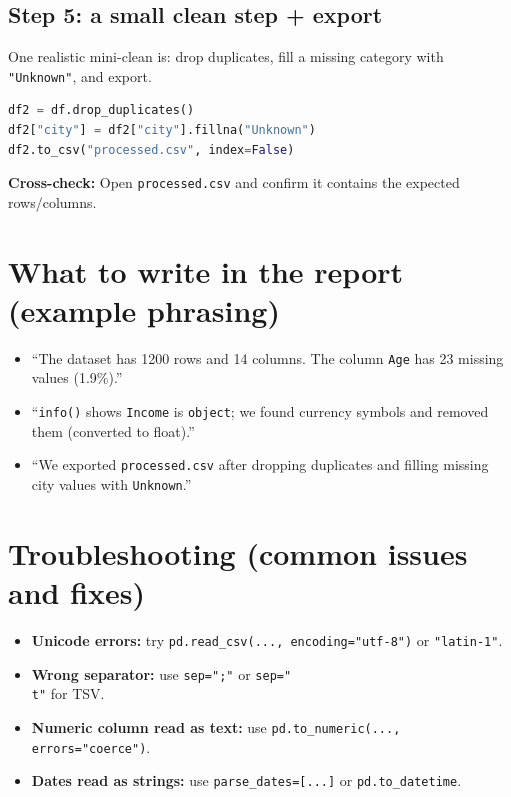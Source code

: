 \documentclass[11pt]{article}
\begin{document}
\subsection{Step 5: a small clean step + export}
One realistic mini-clean is: drop duplicates, fill a missing category with \texttt{"Unknown"}, and export.
\begin{lstlisting}[language=Python]
df2 = df.drop_duplicates()
df2["city"] = df2["city"].fillna("Unknown")
df2.to_csv("processed.csv", index=False)
\end{lstlisting}
\textbf{Cross-check:} Open \texttt{processed.csv} and confirm it contains the expected rows/columns.

\section{What to write in the report (example phrasing)}
\begin{itemize}[leftmargin=*]
  \item ``The dataset has 1200 rows and 14 columns. The column \texttt{Age} has 23 missing values (1.9\%).''
  \item ``\texttt{info()} shows \texttt{Income} is \texttt{object}; we found currency symbols and removed them (converted to float).''
  \item ``We exported \texttt{processed.csv} after dropping duplicates and filling missing city values with \texttt{Unknown}.''
\end{itemize}

\section{Troubleshooting (common issues and fixes)}
\begin{itemize}[leftmargin=*]
  \item \textbf{Unicode errors:} try \texttt{pd.read\_csv(..., encoding="utf-8")} or \texttt{"latin-1"}.
  \item \textbf{Wrong separator:} use \texttt{sep=";"} or \texttt{sep="\\t"} for TSV.
  \item \textbf{Numeric column read as text:} use \texttt{pd.to\_numeric(..., errors="coerce")}.
  \item \textbf{Dates read as strings:} use \texttt{parse\_dates=[...]} or \texttt{pd.to\_datetime}.
\end{itemize}

\notesources{\AIMLLabSources}
\end{document}
